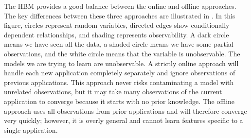 The HBM provides a good balance between the online and offline
approaches.  The key differences between these three approaches are
illustrated in . In this figure, circles
represent random variables, directed edges show conditionally
dependent relationships, and shading represents observability.  A dark
circle means we have seen all the data, a shaded circle means we have
some partial observations, and the white circle means that the
variable is unobservable.  The models we are trying to learn
are unobservable.  A strictly online approach will handle each new
application completely separately and ignore observations of previous
applications.  This approach never risks contaminating a model with
unrelated observations, but it may take many observations of the
current application to converge because it starts with no prior
knowledge. The offline approach uses all observations from prior
applications and will therefore converge very quickly; however, it is
overly general and cannot learn features specific to a single
application.


